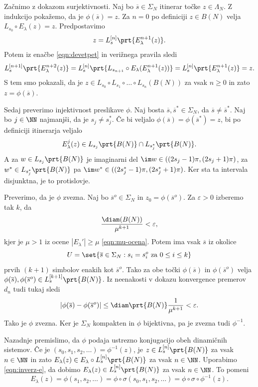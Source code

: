 \begin{dokaz}
    Začnimo z dokazom surjektivnosti. Naj bo \(\overline{s} \in \Sigma_N\) itinerar točke \(z \in \Lambda_N\). Z indukcijo pokažemo, da je \(\phi (\overline{s}) = z\). Za \(n = 0\) po definiciji \(z \in B (N)\) velja \(L_{s_0} \circ E_\lambda (z) = z\). Predpostavimo
    \[z = L_{s}^{[n]} \prt{E_{\lambda}^{n + 1} (z)}.\]
    Potem iz enačbe \eqref{eqn:devetpet} in verižnega pravila sledi
    \[L_{s}^{[n + 1]} \prt{E_{\lambda}^{n + 2} (z)} = L_{s}^{[n]} \prt{L_{s_{n + 1}} \circ E_\lambda (E_\lambda^{n + 1} (z))} = L_{s}^{[n]} \prt{E_\lambda^{n + 1} (z)} = z.\]
    S tem smo pokazali, da je \(z \in L_{s_0} \circ L_{s_1} \circ \dots \circ L_{s_n} (B (N))\) za vsak \(n \geq 0\) in zato \(z = \phi (\overline{s})\).

    Sedaj preverimo injektivnost preslikave \(\phi\). Naj bosta \(\overline{s}, \overline{s}^* \in \Sigma_N\), da \(\overline{s} \neq \overline{s}^*\). Naj bo \(j \in \NN\) najmanjši, da je \(s_j \neq s_j^*\). Če bi veljalo \(\phi (\overline{s}) = \phi (\overline{s}^*) = z\), bi po definiciji itinerarja veljalo
    \[E_\lambda^j (z)\in L_{s_j} \prt{B (N)} \cap L_{s_j^*} \prt{B (N)}.\]
    A za \(w \in L_{s_j} \prt{B (N)}\) je imaginarni del \(\im w \in ((2 s_j - 1) \pi, (2 s_j + 1) \pi)\), za \(w^* \in L_{s_j^*} \prt{B (N)}\) pa \(\im w^* \in ((2 s_j^* - 1) \pi, (2 s_j^* + 1) \pi)\). Ker sta ta intervala disjunktna, je to protislovje.

    Preverimo, da je \(\phi\) zvezna. Naj bo \(\overline{s}^o \in \Sigma_N\) in \(z_0 = \phi (\overline{s}^o)\). Za \(\varepsilon > 0\) izberemo tak \(k\), da
    \[\frac{\diam (B (N))}{\mu^{k + 1}} < \varepsilon,\]
    kjer je \(\mu > 1\) iz ocene \(|E_\lambda'| \geq \mu\) \eqref{eqn:mu-ocena}. Potem ima vsak \(\overline{s}\) iz okolice
    \[U = \set{\overline{s} \in \Sigma_N : s_i = s_i^o \text{ za } 0 \leq i \leq k}\]
    prvih \((k + 1)\) simbolov enakih kot \(\overline{s}^o\). Tako za obe točki \(\phi (\overline{s})\) in \(\phi (\overline{s}^o)\) velja \(\phi (\overline{s}), \phi (\overline{s}^o) \in L_s^{[k + 1]} \prt{B (N)}\). Iz neenakosti v dokazu konvergence premerov \(d_n\) tudi tukaj sledi
    \[\left| \phi (\overline{s}) - \phi (\overline{s}^o) \right| \leq \diam \prt{B (N)} \frac{1}{\mu^{k + 1}} < \varepsilon.\]
    Tako je \(\phi\) zvezna. Ker je \(\Sigma_N\) kompakten in \(\phi\) bijektivna, pa je zvezna tudi \(\phi^{-1}\).

    Nazadnje premislimo, da \(\phi\) podaja ustrezno konjugacijo obeh dinamičnih sistemov. Če je \((s_0, s_1, s_2, \dots) = \phi^{-1} (z)\), je \(z \in L_s^{[n]} \prt{B (N)}\) za vsak \(n \in \NN\) in zato \(E_\lambda (z) \in E_\lambda \circ L_s^{[n]} \prt{B (N)}\) za vsak \(n \in \NN\). Uporabimo \eqref{eqn:inverz-e}, da dobimo \(E_\lambda (z) \in L_s^{[n]} \prt{B (N)}\) za vsak \(n \in \NN\). To pomeni
    \[E_\lambda (z) = \phi (s_1, s_2, \dots) = \phi \circ \sigma (s_0, s_1, s_2, \dots) = \phi \circ \sigma \circ \phi^{-1} (z).\]
\end{dokaz}

